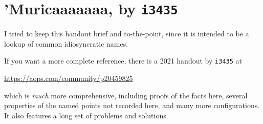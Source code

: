 \documentclass[11pt]{scrartcl}
\begin{document}
\section{’Muricaaaaaaa, by \texttt{i3435}}
I tried to keep this handout brief and to-the-point,
since it is intended to be a lookup of common idiosyncratic names.

If you want a more complete reference, there is a 2021 handout by \texttt{i3435} at
\begin{center}
  \url{https://aops.com/community/p20459825}
\end{center}
which is \emph{much} more comprehensive, including proofs of the facts here,
several properties of the named points not recorded here,
and many more configurations.
It also features a long set of problems and solutions.
\end{document}
